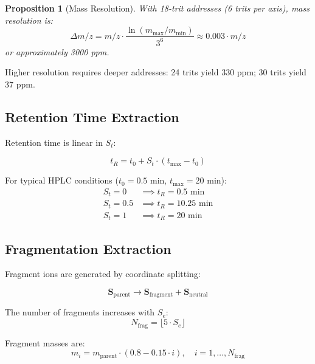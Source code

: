 \documentclass[twocolumn,10pt]{article}
\newtheorem{proposition}[theorem]{Proposition}
\begin{document}
\begin{proposition}[Mass Resolution]
With 18-trit addresses (6 trits per axis), mass resolution is:
\begin{equation}
\Delta m/z = m/z \cdot \frac{\ln(m_{\max}/m_{\min})}{3^6} \approx 0.003 \cdot m/z
\end{equation}
or approximately 3000 ppm.
\end{proposition}

Higher resolution requires deeper addresses: 24 trits yield 330 ppm; 30 trits yield 37 ppm.

\subsection{Retention Time Extraction}

Retention time is linear in $S_t$:

\begin{equation}
t_R = t_0 + S_t \cdot (t_{\max} - t_0)
\end{equation}

For typical HPLC conditions ($t_0 = 0.5$ min, $t_{\max} = 20$ min):
\begin{align}
S_t = 0 &\implies t_R = 0.5 \text{ min} \\
S_t = 0.5 &\implies t_R = 10.25 \text{ min} \\
S_t = 1 &\implies t_R = 20 \text{ min}
\end{align}

\subsection{Fragmentation Extraction}

Fragment ions are generated by coordinate splitting:

\begin{equation}
\mathbf{S}_{\text{parent}} \to \mathbf{S}_{\text{fragment}} + \mathbf{S}_{\text{neutral}}
\end{equation}

The number of fragments increases with $S_e$:
\begin{equation}
N_{\text{frag}} = \lfloor 5 \cdot S_e \rfloor
\end{equation}

Fragment masses are:
\begin{equation}
m_i = m_{\text{parent}} \cdot (0.8 - 0.15 \cdot i), \quad i = 1, \ldots, N_{\text{frag}}
\end{equation}
\end{document}
